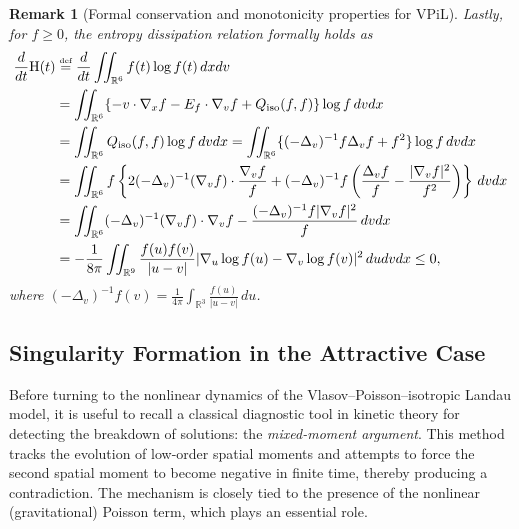 \documentclass[reqno,11pt,final]{amsart}
\theoremstyle{plain}
\newtheorem{remark}[theorem]{Remark}
\numberwithin{equation}{section}
\numberwithin{theorem}{section}
\newcommand{\eqdef }{\overset{\mbox{\tiny{def}}}{=}}
\begin{document}
\begin{remark}[Formal conservation and monotonicity properties for VPiL]
Lastly, for $f\ge0$, the entropy dissipation relation formally holds as
\begin{align*}
\frac{d}{dt}\textup{H}(t) &\eqdef \frac{d}{dt}\iint_{\mathbb{R}^6} f(t)\log f(t)\,dxdv\\
&= \iint_{\mathbb{R}^6} \{-v\cdot\nabla_xf - E_f \cdot\nabla_vf + Q_\textup{iso}(f,f)\}\log f\,dvdx\\
&= \iint_{\mathbb{R}^6} Q_\textup{iso}(f,f) \log f\,dvdx = \iint_{\mathbb{R}^6} \{(-\Delta_v)^{-1}f\Delta_vf + f^2\}\log f\,dvdx\\
&= \iint_{\mathbb{R}^6} f\left\{2(-\Delta_v)^{-1}(\nabla_vf)\cdot \frac{\nabla_vf}{f} + (-\Delta_v)^{-1}f \left(\frac{\Delta_vf}{f} - \frac{|\nabla_vf|^2}{f^2}\right)\right\}\,dvdx\\
&= \iint_{\mathbb{R}^6} (-\Delta_v)^{-1}(\nabla_vf)\cdot\nabla_vf - \frac{(-\Delta_v)^{-1}f|\nabla_vf|^{2}}{f}\,dvdx\\
&= -\frac{1}{8\pi}\iint_{\mathbb{R}^9} \frac{f(u)f(v)}{|u-v|} |\nabla_u\log f(u) - \nabla_v\log f(v)|^2\,dudvdx\le0,
\end{align*}where $(-\Delta_v)^{-1}f(v) = \frac{1}{4\pi}\int_{\mathbb{R}^3}\frac{f(u)}{|u-v|}\,du$.
\end{remark}

\subsection{Singularity Formation in the Attractive Case}

Before turning to the nonlinear dynamics of the Vlasov--Poisson--isotropic Landau
model, it is useful to recall a classical diagnostic tool in kinetic theory for detecting
the breakdown of solutions: the \emph{mixed-moment argument}. This method tracks
the evolution of low-order spatial moments and attempts to force the second spatial
moment to become negative in finite time, thereby producing a contradiction. The
mechanism is closely tied to the presence of the nonlinear (gravitational) Poisson
term, which plays an essential role.
\end{document}
